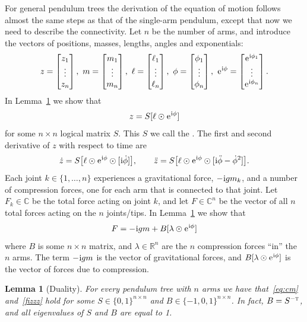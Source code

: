 \documentclass[12pt]{article}
\newcommand{\T}{\textsc{t}}
\newcommand{\mi}{\hspace{.4pt}\mathrm{i}}
\newcommand{\e}{\hspace{.4pt}\mathrm{e}}
\theoremstyle{sfdefinition}%
\newtheorem{lemma}{Lemma}[section]
\theoremstyle{sfdefinition}
\newcommand{\mymatrix}[1]{\begin{bmatrix} #1 \end{bmatrix}}
\newcommand{\emphx}[1]{\underline{\smash{#1}}}
\newcommand{\mR}{\mathbb{R}}
\newcommand{\mC}{\mathbb{C}}
\newcommand{\ep}{\odot}
\begin{document}
For general pendulum trees the derivation of the equation of motion
follows almost the same steps as that of the single-arm pendulum,
except that now we need to describe the connectivity. Let $n$ be
the number of arms, and introduce the vectors of positions, masses,
lengths, angles and exponentials:
\[
  z=\mymatrix{z_1\\ \vdots \\z_n}, ~
  m=\mymatrix{m_1\\ \vdots\\m_n}, ~
  \ell=\mymatrix{\ell_1\\ \vdots\\ \ell_n}, ~
  \phi=\mymatrix{\phi_1\\ \vdots \\ \phi_n}, ~
  \e^{\mi\phi}=\mymatrix{\e^{\mi\phi_1}\\ \vdots\\ \e^{\mi\phi_n}}.
\]
In Lemma~\ref{lem:dual} we show that
\begin{equation}
  \label{eq:cm}
  z= S[\ell\ep\e^{\mi\phi}]
\end{equation}
for some $n\times n$ logical matrix $S$. This $S$ we call the
\emphx{connectivity matrix}.  The first and second derivative of $z$
with respect to time are
\[
  \dot{z}=S\bigl[\ell\ep\e^{\mi\phi}\ep[\mi\dot{\phi}]\bigr],
  \qquad
  \ddot{z}=S\bigl[\ell\ep\e^{\mi\phi}\ep[\mi\ddot{\phi}-\dot{\phi}^2]\bigr].
\]
Each joint $k\in\{1,\ldots,n\}$ experiences a gravitational force,
$-\mi gm_k$, and a number of compression forces, one for each arm that
is connected to that joint.  Let $F_k\in\mC$ be the total force acting
on joint $k$, and let $F\in\mC^n$ be the vector of all $n$ total
forces acting on the $n$ joints/tips. In Lemma~\ref{lem:dual} we show
that
\begin{equation}\label{fizzz}
  F=-\mi g m+ B[\lambda\ep\e^{\mi\phi}]
\end{equation}
where $B$ is some $n\times n$ matrix, and $\lambda\in\mR^n$ are the
$n$ compression forces ``in'' the $n$ arms. The term $-\mi gm$ is the
vector of gravitational forces, and $B[\lambda\ep\e^{\mi\phi}]$ is
the vector of forces due to compression.
%
\begin{lemma}[Duality]\label{lem:dual}
  For every pendulum tree with $n$ arms we have that~\eqref{eq:cm}
  and~\eqref{fizzz} hold for some $S\in\{0,1\}^{n\times n}$ and
  $B\in\{-1,0,1\}^{n\times n}$. In fact, $B=S^{-\T}$, and all
  eigenvalues of $S$ and $B$ are equal to 1.
\end{lemma}
\end{document}
